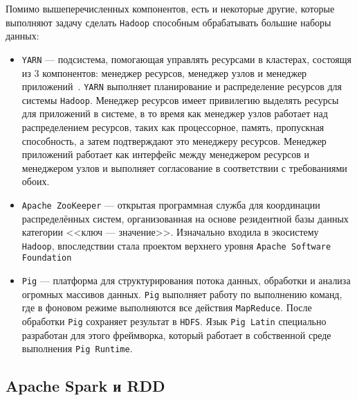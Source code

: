 Помимо вышеперечисленных компонентов, есть и некоторые другие, которые выполняют задачу сделать \texttt{Hadoop} способным обрабатывать большие наборы данных:
\begin{itemize}
  \item \texttt{YARN} --- подсистема, помогающая управлять ресурсами в кластерах, состоящя из 3 компонентов: менеджер ресурсов, менеджер узлов и менеджер приложений~\cite{Perwej2017AnEE}. 
    \texttt{YARN} выполняет планирование и распределение ресурсов для системы \texttt{Hadoop}.
    Менеджер ресурсов имеет привилегию выделять ресурсы для приложений в системе, в то время как менеджер узлов работает над распределением ресурсов, таких как процессорное, память, пропускная способность, а затем подтверждают это менеджеру ресурсов.
    Менеджер приложений работает как интерфейс между менеджером ресурсов и менеджером узлов и выполняет согласование в соответствии с требованиями обоих.
  \item \texttt{Apache ZooKeeper} --- открытая программная служба для координации распределённых систем, организованная на основе резидентной базы данных категории <<ключ --- значение>>. 
    Изначально входила в экосистему \texttt{Hadoop}, впоследствии стала проектом верхнего уровня \texttt{Apache Software Foundation}
  \item \texttt{Pig} --- платформа для структурирования потока данных, обработки и анализа огромных массивов данных.
    \texttt{Pig} выполняет работу по выполнению команд, где в фоновом режиме выполняются все действия \texttt{MapReduce}. 
    После обработки \texttt{Pig} сохраняет результат в \texttt{HDFS}. Язык \texttt{Pig Latin} специально разработан для этого фреймворка, который работает в собственной среде выполнения \texttt{Pig Runtime}. 
\end{itemize}


\subsection{Apache Spark и RDD}


